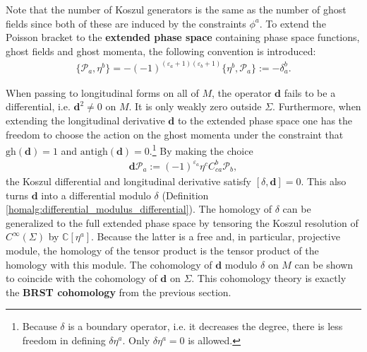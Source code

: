     Note that the number of Koszul generators is the same as the number of ghost fields since both of these are induced by the constraints $\phi^a$. To extend the Poisson bracket to the \textbf{extended phase space} containing phase space functions, ghost fields and ghost momenta, the following convention is introduced:
    \begin{gather}
        \{\mathcal{P}_a,\eta^b\} = -(-1)^{(\varepsilon_a+1)(\varepsilon_b+1)}\{\eta^b,\mathcal{P}_a\} := -\delta_a^b.
    \end{gather}

    When passing to longitudinal forms on all of $M$, the operator $\mathbf{d}$ fails to be a differential, i.e. $\mathbf{d}^2\neq0$ on $M$. It is only weakly zero outside $\Sigma$. Furthermore, when extending the longitudinal derivative $\mathbf{d}$ to the extended phase space one has the freedom to choose the action on the ghost momenta under the constraint that $\mathrm{gh}(\mathbf{d})=1$ and $\mathrm{antigh}(\mathbf{d})=0$.\footnote{Because $\delta$ is a boundary operator, i.e. it decreases the degree, there is less freedom in defining $\delta\eta^a$. Only $\delta\eta^a=0$ is allowed.} By making the choice
    \begin{gather}
        \mathbf{d}\mathcal{P}_a := (-1)^{\varepsilon_a}\eta^c C^b_{ca}\mathcal{P}_b,
    \end{gather}
    the Koszul differential and longitudinal derivative satisfy $[\delta,\mathbf{d}]=0$. This also turns $\mathbf{d}$ into a differential modulo $\delta$ (Definition \ref{homalg:differential_modulus_differential}). The homology of $\delta$ can be generalized to the full extended phase space by tensoring the Koszul resolution of $C^\infty(\Sigma)$ by $\mathbb{C}[\eta^a]$. Because the latter is a free and, in particular, projective module, the homology of the tensor product is the tensor product of the homology with this module. The cohomology of $\mathbf{d}$ modulo $\delta$ on $M$ can be shown to coincide with the cohomology of $\mathbf{d}$ on $\Sigma$. This cohomology theory is exactly the \textbf{BRST cohomology} from the previous section.

